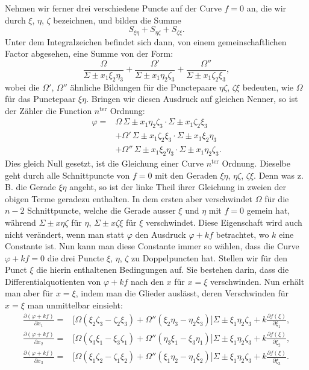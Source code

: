 \documentclass[10pt]{article}
\begin{document}
Nehmen wir ferner drei verschiedene Puncte auf der Curve $f=0$ an, die wir durch $\xi$, $\eta$, $\zeta$ bezeichnen, und bilden die Summe
\[
S_{\xi\eta}+S_{\eta\zeta}+S_{\zeta\xi}.
\]
Unter dem Integralzeichen befindet sich dann, von einem gemeinschaftlichen Factor abgesehen, eine Summe von der Form:
\[
\frac{\Omega}{\Sigma\pm x_1\xi_2\eta_3}
+\frac{\Omega'}{\Sigma\pm x_1\eta_2\zeta_3}
+\frac{\Omega''}{\Sigma\pm x_1\zeta_2\xi_3},
\]
wobei die $\Omega'$, $\Omega''$ ähnliche Bildungen für die Punctepaare $\eta\zeta$, $\zeta\xi$ bedeuten, wie $\Omega$ für das Punctepaar $\xi\eta$. Bringen wir diesen Ausdruck auf gleichen Nenner, so ist der Zähler die Function $n^{\mathrm{ter}}$ Ordnung:
\[
\begin{aligned}
\varphi={}&\Omega\,\Sigma\pm x_1\eta_2\zeta_3\cdot\Sigma\pm x_1\zeta_2\xi_3\\
&+\Omega'\,\Sigma\pm x_1\zeta_2\xi_3\cdot\Sigma\pm x_1\xi_2\eta_3\\
&+\Omega''\,\Sigma\pm x_1\xi_2\eta_3\cdot\Sigma\pm x_1\eta_2\zeta_3.
\end{aligned}
\]
Dies gleich Null gesetzt, ist die Gleichung einer Curve $n^{\mathrm{ter}}$ Ordnung. Dieselbe geht durch alle Schnittpuncte von $f=0$ mit den Geraden $\xi\eta$, $\eta\zeta$, $\zeta\xi$. Denn was z. B. die Gerade $\xi\eta$ angeht, so ist der linke Theil ihrer Gleichung in zweien der obigen Terme geradezu enthalten. In dem ersten aber verschwindet $\Omega$ für die $n-2$ Schnittpuncte, welche die Gerade ausser $\xi$ und $\eta$ mit $f=0$ gemein hat, während $\Sigma\pm x\eta\zeta$ für $\eta$, $\Sigma\pm x\zeta\xi$ für $\xi$ verschwindet. Diese Eigenschaft wird auch nicht verändert, wenn man statt $\varphi$ den Ausdruck $\varphi+kf$ betrachtet, wo $k$ eine Constante ist. Nun kann man diese Constante immer so wählen, dass die Curve $\varphi+kf=0$ die drei Puncte $\xi$, $\eta$, $\zeta$ zu Doppelpuncten hat. Stellen wir für den Punct $\xi$ die hierin enthaltenen Bedingungen auf. Sie bestehen darin, dass die Differentialquotienten von $\varphi+kf$ nach den $x$ für $x=\xi$ verschwinden. Nun erhält man aber für $x=\xi$, indem man die Glieder auslässt, deren Verschwinden für $x=\xi$ man unmittelbar einsieht:
\[
\begin{aligned}
\frac{\partial(\varphi+kf)}{\partial x_1}
={}&\bigl[\Omega(\xi_2\zeta_3-\zeta_2\xi_3)+\Omega''(\xi_2\eta_3-\eta_2\xi_3)\bigr]\Sigma\pm \xi_1\eta_2\zeta_3+k\frac{\partial f(\xi)}{\partial \xi_1},\\
\frac{\partial(\varphi+kf)}{\partial x_2}
={}&\bigl[\Omega(\zeta_3\xi_1-\xi_3\zeta_1)+\Omega''(\eta_3\xi_1-\xi_3\eta_1)\bigr]\Sigma\pm \xi_1\eta_2\zeta_3+k\frac{\partial f(\xi)}{\partial \xi_2},\\
\frac{\partial(\varphi+kf)}{\partial x_3}
={}&\bigl[\Omega(\xi_1\zeta_2-\zeta_1\xi_2)+\Omega''(\xi_1\eta_2-\eta_1\xi_2)\bigr]\Sigma\pm \xi_1\eta_2\zeta_3+k\frac{\partial f(\xi)}{\partial \xi_3}.
\end{aligned}
\]
\end{document}

